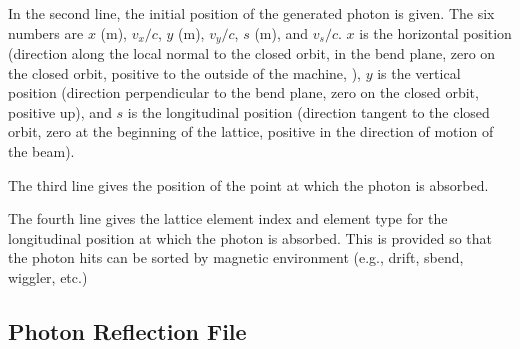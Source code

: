 \documentclass[11pt]{article}
\begin{document}
In the second line, the initial position of the generated photon is
given. The six numbers are $x$ (m), $v_x/c$, $y$ (m), $v_y/c$, $s$
(m), and $v_s/c.$ $x$ is the horizontal position (direction along the
local normal to the closed orbit, in the bend plane, zero on the
closed orbit, positive to the outside of the machine, ), $y$ is the
vertical position (direction perpendicular to the bend plane, zero on
the closed orbit, positive up), and $s$ is the longitudinal position
(direction tangent to the closed orbit, zero at the beginning of the
lattice, positive in the direction of motion of the beam).

The third line gives the position of the point at which the photon is absorbed.

The fourth line gives the lattice element index and element type for
the longitudinal position at which the photon is absorbed. This is
provided so that the photon hits can be sorted by magnetic environment
(e.g., drift, sbend, wiggler, etc.)  


\subsection{Photon Reflection File}
\end{document}
